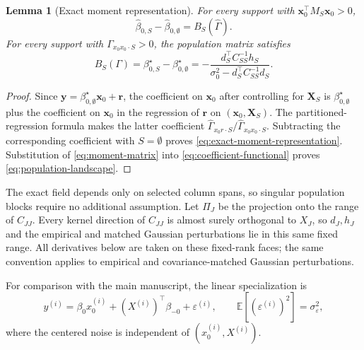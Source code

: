 \documentclass[a4paper,11pt,english]{article}
\newtheorem{lemma}[theorem]{Lemma}
\newcommand{\E}{\mathbb E}
\begin{document}
\begin{lemma}[Exact moment representation]\label{lem:exact-moment}
For every support with $\mathbf x_0^\top M_S\mathbf x_0>0$,
\begin{equation}\label{eq:exact-moment-representation}
        \hat\beta_{0,S}-\hat\beta_{0,\emptyset}
        =B_S(\hat\Gamma).
\end{equation}
For every support with $\Gamma_{x_0x_0\mathbin{\cdot}S}>0$, the population
matrix satisfies
\begin{equation}\label{eq:population-landscape}
        B_S(\Gamma)
        =\beta_{0,S}^\star-\beta_{0,\emptyset}^\star
        =-\frac{d_S^\top C_{SS}^{-1}h_S}
        {\sigma_0^2-d_S^\top C_{SS}^{-1}d_S}.
\end{equation}
\end{lemma}

\begin{proof}
Since $\mathbf y=\beta_{0,\emptyset}^\star\mathbf x_0+\mathbf r$, the coefficient on
$\mathbf x_0$ after controlling for $\mathbf X_S$ is $\beta_{0,\emptyset}^\star$ plus
the coefficient on $\mathbf x_0$ in the regression of $\mathbf r$ on
$(\mathbf x_0,\mathbf X_S)$.  The partitioned-regression formula makes
the latter coefficient
$\hat\Gamma_{x_0r\mathbin{\cdot}S}/
\hat\Gamma_{x_0x_0\mathbin{\cdot}S}$.  Subtracting the corresponding
coefficient with $S=\emptyset$ proves
\eqref{eq:exact-moment-representation}.  Substitution of
\eqref{eq:moment-matrix} into \eqref{eq:coefficient-functional} proves
\eqref{eq:population-landscape}.
\end{proof}

The exact field depends only on selected column spans, so singular
population blocks require no additional assumption.  Let $\Pi_J$ be the
projection onto the range of $C_{JJ}$.  Every kernel direction of
$C_{JJ}$ is almost surely orthogonal to $X_J$, so $d_J,h_J$ and the
empirical and matched Gaussian perturbations lie in this same fixed
range.  All derivatives below are taken on these fixed-rank faces; the
same convention applies to empirical and covariance-matched Gaussian
perturbations.

For comparison with the main manuscript, the linear specialization is
\begin{equation}\label{eq:model}
        y^{(i)}=\beta_0x_0^{(i)}+(X^{(i)})^\top\beta_{-0}
        +\varepsilon^{(i)},
        \qquad \E[(\varepsilon^{(i)})^2]=\sigma_\varepsilon^2,
\end{equation}
where the centered noise is independent of $(x_0^{(i)},X^{(i)})$.
\end{document}
